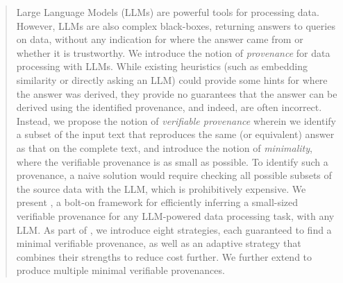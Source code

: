 \begin{abstract}
Large Language Models (LLMs) are powerful tools for processing data. However, LLMs are also complex black-boxes, returning answers to queries on data, without any indication for where the answer came from or whether it is trustworthy. We introduce the notion of {\em provenance} for data processing with LLMs. While existing heuristics (such as embedding similarity or directly asking an LLM) could provide some hints for where the answer was derived, they provide no guarantees that the answer can be derived using the identified provenance, and indeed, are often incorrect. Instead, we propose the notion of {\em verifiable provenance} wherein we identify a subset of the input text that reproduces the same (or equivalent) answer as that on the complete text, and introduce the notion of {\em minimality}, where the verifiable provenance is as small as possible. To identify such a provenance, a naive solution would require checking all possible subsets of the source data with the LLM, which is prohibitively expensive. We present \sys, a bolt-on framework for efficiently inferring a small-sized verifiable provenance for any LLM-powered data processing task, with any LLM. As part of \sys, we introduce eight strategies, each guaranteed to find a minimal verifiable provenance, as well as an adaptive strategy that combines their strengths to reduce cost further. We further extend \sys to produce multiple minimal verifiable provenances. 
\end{abstract}
 